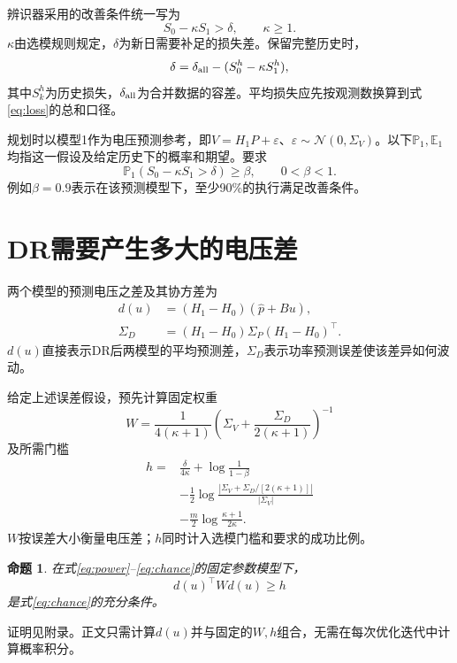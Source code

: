\documentclass[journal,10pt]{IEEEtran}
\newcommand{\E}{\mathbb E}
\newcommand{\Prob}{\mathbb P}
\newtheorem{proposition}{命题}
\begin{document}
辨识器采用的改善条件统一写为
\begin{equation}
S_0-\kappa S_1>\delta,\qquad \kappa\ge1. \label{eq:gate}
\end{equation}
$\kappa$由选模规则规定，$\delta$为新日需要补足的损失差。保留完整历史时，
\begin{equation}
\delta=\delta_{\rm all}-(S_0^h-\kappa S_1^h), \label{eq:history}
\end{equation}
其中$S_k^h$为历史损失，$\delta_{\rm all}$为合并数据的容差。平均损失应先按观测数换算到式\eqref{eq:loss}的总和口径。

规划时以模型1作为电压预测参考，即$V=H_1P+\varepsilon$、$\varepsilon\sim\mathcal N(0,\Sigma_V)$。以下$\Prob_1,\E_1$均指这一假设及给定历史下的概率和期望。要求
\begin{equation}
\Prob_1(S_0-\kappa S_1>\delta)\ge\beta,\qquad 0<\beta<1. \label{eq:chance}
\end{equation}
例如$\beta=0.9$表示在该预测模型下，至少90\%的执行满足改善条件。

\section{DR需要产生多大的电压差}
两个模型的预测电压之差及其协方差为
\begin{align}
d(u)&=(H_1-H_0)(\widehat p+Bu), \label{eq:d}\\
\Sigma_D&=(H_1-H_0)\Sigma_P(H_1-H_0)^\top. \label{eq:cov}
\end{align}
$d(u)$直接表示DR后两模型的平均预测差，$\Sigma_D$表示功率预测误差使该差异如何波动。

给定上述误差假设，预先计算固定权重
\begin{equation}
W=\frac{1}{4(\kappa+1)}
\left(\Sigma_V+\frac{\Sigma_D}{2(\kappa+1)}\right)^{-1} \label{eq:weight}
\end{equation}
及所需门槛
\begin{equation}
\begin{split}
h={}&\frac{\delta}{4\kappa}+\log\frac1{1-\beta}\\
&-\frac12\log
\frac{\left|\Sigma_V+\Sigma_D/[2(\kappa+1)]\right|}{|\Sigma_V|}\\
&-\frac m2\log\frac{\kappa+1}{2\kappa}.
\end{split} \label{eq:h}
\end{equation}
$W$按误差大小衡量电压差；$h$同时计入选模门槛和要求的成功比例。

\begin{proposition}
在式\eqref{eq:power}--\eqref{eq:chance}的固定参数模型下，
\begin{equation}
\boxed{d(u)^\top Wd(u)\ge h} \label{eq:condition}
\end{equation}
是式\eqref{eq:chance}的充分条件。
\end{proposition}
证明见附录。正文只需计算$d(u)$并与固定的$W,h$组合，无需在每次优化迭代中计算概率积分。
\end{document}
